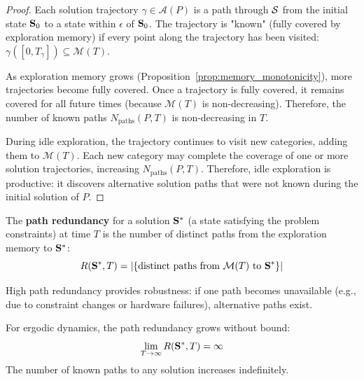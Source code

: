 \begin{proof}
Each solution trajectory $\gamma \in \mathcal{A}(P)$ is a path through $\mathcal{S}$ from the initial state $\mathbf{S}_0$ to a state within $\epsilon$ of $\mathbf{S}_0$. The trajectory is "known" (fully covered by exploration memory) if every point along the trajectory has been visited: $\gamma([0, T_\gamma]) \subseteq \mathcal{M}(T)$.

As exploration memory grows (Proposition~\ref{prop:memory_monotonicity}), more trajectories become fully covered. Once a trajectory is fully covered, it remains covered for all future times (because $\mathcal{M}(T)$ is non-decreasing). Therefore, the number of known paths $N_{\text{paths}}(P, T)$ is non-decreasing in $T$.

During idle exploration, the trajectory continues to visit new categories, adding them to $\mathcal{M}(T)$. Each new category may complete the coverage of one or more solution trajectories, increasing $N_{\text{paths}}(P, T)$. Therefore, idle exploration is productive: it discovers alternative solution paths that were not known during the initial solution of $P$.
\end{proof}

\begin{definition}
\label{def:path_redundancy}
The \textbf{path redundancy} for a solution $\mathbf{S}^*$ (a state satisfying the problem constraints) at time $T$ is the number of distinct paths from the exploration memory to $\mathbf{S}^*$:
\begin{equation}
R(\mathbf{S}^*, T) = |\{\text{distinct paths from } \mathcal{M}(T) \text{ to } \mathbf{S}^*\}|
\label{eq:path_redundancy}
\end{equation}

High path redundancy provides robustness: if one path becomes unavailable (e.g., due to constraint changes or hardware failures), alternative paths exist.
\end{definition}

\begin{proposition}
\label{prop:redundancy_growth}
For ergodic dynamics, the path redundancy grows without bound:
\begin{equation}
\lim_{T \to \infty} R(\mathbf{S}^*, T) = \infty
\label{eq:redundancy_growth}
\end{equation}
The number of known paths to any solution increases indefinitely.
\end{proposition}

